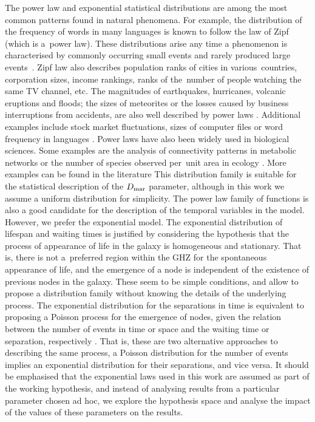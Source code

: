 \documentclass[crop]{CSLB}
\begin{document}
The power law and exponential statistical distributions are among the most
common patterns found in natural phenomena.
%
For example, the distribution of the frequency of words in many languages is
known to follow the law of Zipf (which is a power law).
%
These distributions arise any time a phenomenon is characterised by commonly
occurring small events and rarely produced large events \citep[e.g.
][]{adamic_zipf_2000}.
%
Zipf law also describes population ranks of cities in various countries,
corporation sizes, income rankings, ranks of the number of people watching the
same TV channel, etc.
%
The magnitudes of earthquakes, hurricanes, volcanic eruptions and floods; the
sizes of meteorites or the losses caused by business interruptions from
accidents, are also well described by power laws
\citep{sornette_critical_2006}.
%
%
Additional examples include stock market fluctuations, sizes of computer files
or word frequency in languages \citep{mitzenmacher_brief_2004,
newman_power_2005, simkin_theory_2006}. 
%
Power laws have also been widely used in biological sciences.
%
Some examples are the analysis of connectivity patterns in metabolic networks
\citep{jeong_large_2000} or the number of species observed per unit area in
ecology \citep{martin_origin_2006, frank_common_2009}.
%
More examples can be found in the literature \citep{martin_origin_2006,
maccone_KLT_2010} \citep{barabasi_scale_2009, maccone_evolution_2014}
\citep{maccone_lognormals_2014}
%
This distribution family is suitable for the statistical description
of the $D_{\rm mar}$ parameter, although in this work we assume a uniform
distribution for simplicity.
%
The power law family of functions is also a good candidate for the description of
the temporal variables in the model.
%
However, we prefer the exponential model.
%
The exponential distribution of lifespan and waiting times is justified by
considering the hypothesis that the process of appearance of life in the galaxy
is homogeneous and stationary.
%
That is, there is not a preferred region within
the GHZ for the spontaneous appearance of life, and the emergence of a node is
independent of the existence of previous nodes in the galaxy.
%
These seem to be simple conditions, and allow to propose a distribution family
without knowing the details of the underlying process.
%
The exponential distribution for the separations in time is equivalent to
proposing a Poisson process for the emergence of nodes, given the relation
between the number of events in time or space and the waiting time or
separation, respectively \citep[e.g., ][]{ross_simulation_2012}.
%
That is, these
are two alternative approaches to describing the same process, a Poisson
distribution for the number of events implies an exponential distribution for
their separations, and vice versa.
%
It should be emphasised that the exponential
laws used in this work are assumed as part of the working hypothesis, and
instead of analysing results from a particular parameter chosen ad hoc, we
explore the hypothesis space and analyse the impact of the values of these
parameters on the results.
\end{document}
